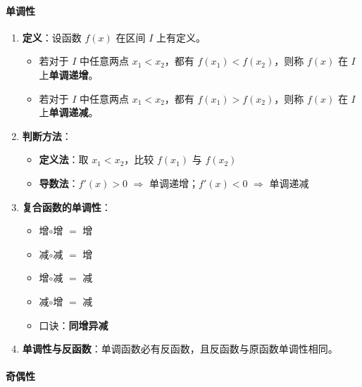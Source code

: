 \documentclass[../book.tex]{subfiles}
\begin{document}
    \paragraph{单调性}

    \begin{enumerate}
        \item \textbf{定义}：设函数 $f(x)$ 在区间 $I$ 上有定义。
        \begin{itemize}
            \item 若对于 $I$ 中任意两点 $x_1 < x_2$，都有 $f(x_1) < f(x_2)$，则称 $f(x)$ 在 $I$ 上\textbf{单调递增}。
            \item 若对于 $I$ 中任意两点 $x_1 < x_2$，都有 $f(x_1) > f(x_2)$，则称 $f(x)$ 在 $I$ 上\textbf{单调递减}。
        \end{itemize}

        \item \textbf{判断方法}：
        \begin{itemize}
            \item \textbf{定义法}：取 $x_1 < x_2$，比较 $f(x_1)$ 与 $f(x_2)$
            \item \textbf{导数法}：$f'(x) > 0$ $\Rightarrow$ 单调递增；$f'(x) < 0$ $\Rightarrow$ 单调递减
        \end{itemize}

        \item \textbf{复合函数的单调性}：
        \begin{itemize}
            \item 增$\circ$增 $=$ 增
            \item 减$\circ$减 $=$ 增
            \item 增$\circ$减 $=$ 减
            \item 减$\circ$增 $=$ 减
            \item 口诀：\textbf{同增异减}
        \end{itemize}

        \item \textbf{单调性与反函数}：单调函数必有反函数，且反函数与原函数单调性相同。
    \end{enumerate}

    \paragraph{奇偶性}
\end{document}
